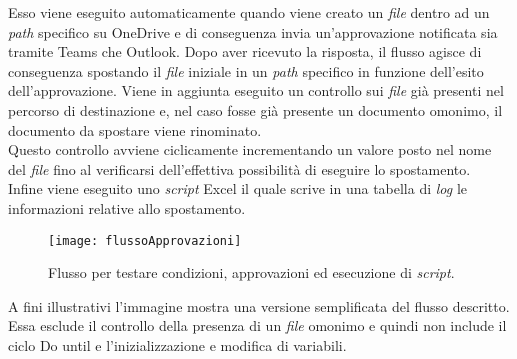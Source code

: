 Esso viene eseguito automaticamente quando viene creato un \emph{file} dentro ad un \emph{path} specifico su OneDrive e di conseguenza invia un'approvazione notificata sia tramite Teams che Outlook.
Dopo aver ricevuto la risposta, il flusso agisce di conseguenza spostando il \emph{file} iniziale in un \emph{path} specifico in funzione dell'esito dell'approvazione.
Viene in aggiunta eseguito un controllo sui \emph{file} già presenti nel percorso di destinazione e, nel caso fosse già presente un documento omonimo, il documento da spostare viene rinominato.\\
Questo controllo avviene ciclicamente incrementando un valore posto nel nome del \emph{file} fino al verificarsi dell'effettiva possibilità di eseguire lo spostamento.\\
Infine viene eseguito uno \emph{script} Excel il quale scrive in una tabella di \emph{log} le informazioni relative allo spostamento.
\begin{figure}[htbp] 
    \centering 
    \texttt{[image: flussoApprovazioni]} 
    \caption{Flusso per testare condizioni, approvazioni ed esecuzione di \emph{script}.}
    \label{fig:flussoApprovazioni}
\end{figure}
\newline \noindent A fini illustrativi l'immagine mostra una versione semplificata del flusso descritto.
Essa esclude il controllo della presenza di un \emph{file} omonimo e quindi non include il ciclo Do until e l'inizializzazione e modifica di variabili.\\



